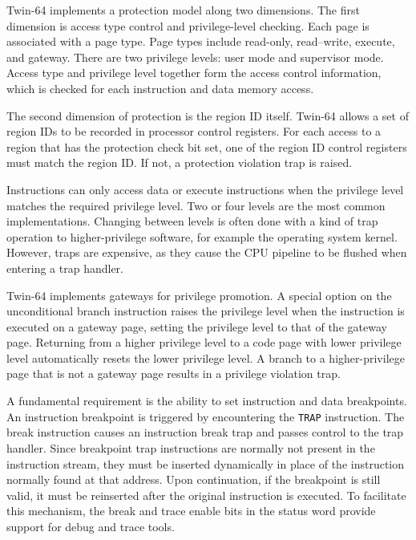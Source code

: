 
Twin-64 implements a protection model along two dimensions. The first dimension is access type control and privilege-level checking. Each page is associated with a page type. Page types include read-only, read–write, execute, and gateway. There are two privilege levels: user mode and supervisor mode. Access type and privilege level together form the access control information, which is checked for each instruction and data memory access. 

The second dimension of protection is the region ID itself. Twin-64 allows a set of region IDs to be recorded in processor control registers. For each access to a region that has the protection check bit set, one of the region ID control registers must match the region ID. If not, a protection violation trap is raised.


Instructions can only access data or execute instructions when the privilege level matches the required privilege level. Two or four levels are the most common implementations. Changing between levels is often done with a kind of trap operation to higher-privilege software, for example the operating system kernel. However, traps are expensive, as they cause the CPU pipeline to be flushed when entering a trap handler.

Twin-64 implements gateways for privilege promotion. A special option on the unconditional branch instruction raises the privilege level when the instruction is executed on a gateway page, setting the privilege level to that of the gateway page. Returning from a higher privilege level to a code page with lower privilege level automatically resets the lower privilege level. A branch to a higher-privilege page that is not a gateway page results in a privilege violation trap.


A fundamental requirement is the ability to set instruction and data breakpoints. An instruction breakpoint is triggered by encountering the \texttt{TRAP} instruction. The break instruction causes an instruction break trap and passes control to the trap handler. Since breakpoint trap instructions are normally not present in the instruction stream, they must be inserted dynamically in place of the instruction normally found at that address. Upon continuation, if the breakpoint is still valid, it must be reinserted after the original instruction is executed. To facilitate this mechanism, the break and trace enable bits in the status word provide support for debug and trace tools.


